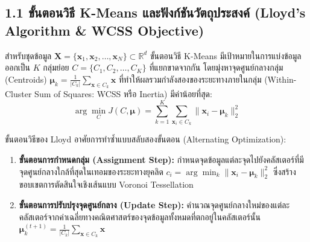 \documentclass[12pt,a4paper]{article}
\begin{document}
\subsection*{1.1 ขั้นตอนวิธี K-Means และฟังก์ชันวัตถุประสงค์ (Lloyd's Algorithm \& WCSS Objective)}
สำหรับชุดข้อมูล $\mathbf{X} = \{\mathbf{x}_1, \mathbf{x}_2, \dots, \mathbf{x}_N\} \subset \mathbb{R}^d$ ขั้นตอนวิธี K-Means มีเป้าหมายในการแบ่งข้อมูลออกเป็น $K$ กลุ่มย่อย $C = \{C_1, C_2, \dots, C_K\}$ ที่แยกขาดจากกัน โดยมุ่งหาจุดศูนย์กลางกลุ่ม (Centroids) $\boldsymbol{\mu}_k = \frac{1}{|C_k|} \sum_{\mathbf{x} \in C_k} \mathbf{x}$ ที่ทำให้ผลรวมกำลังสองของระยะทางภายในกลุ่ม (Within-Cluster Sum of Squares: WCSS หรือ Inertia) มีค่าน้อยที่สุด:
\begin{equation}
    \arg\min_{C} J(C, \boldsymbol{\mu}) = \sum_{k=1}^K \sum_{\mathbf{x}_i \in C_k} \|\mathbf{x}_i - \boldsymbol{\mu}_k\|_2^2
\end{equation}

ขั้นตอนวิธีของ Lloyd อาศัยการทำซ้ำแบบสลับสองขั้นตอน (Alternating Optimization):
\begin{enumerate}[leftmargin=1.8em, itemsep=1.5pt]
    \item \textbf{ขั้นตอนการกำหนดกลุ่ม (Assignment Step):} กำหนดจุดข้อมูลแต่ละจุดไปยังคลัสเตอร์ที่มีจุดศูนย์กลางใกล้ที่สุดในเทอมของระยะทางยุคลิด $c_i = \arg\min_{k} \|\mathbf{x}_i - \boldsymbol{\mu}_k\|_2^2$ ซึ่งสร้างขอบเขตการตัดสินใจเชิงเส้นแบบ Voronoi Tessellation
    \item \textbf{ขั้นตอนการปรับปรุงจุดศูนย์กลาง (Update Step):} คำนวณจุดศูนย์กลางใหม่ของแต่ละคลัสเตอร์จากค่าเฉลี่ยทางคณิตศาสตร์ของจุดข้อมูลทั้งหมดที่ตกอยู่ในคลัสเตอร์นั้น $\boldsymbol{\mu}_k^{(t+1)} = \frac{1}{|C_k|} \sum_{\mathbf{x} \in C_k} \mathbf{x}$
\end{enumerate}
\end{document}
